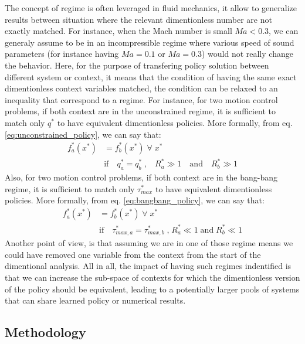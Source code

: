 The concept of regime is often leveraged in fluid mechanics, it allow to generalize results between situation where the relevant dimentionless number are not exactly matched. For instance, when the Mach number is small $Ma < 0.3$, we can generaly assume to be in an incompressible regime where various speed of sound parameters (for instance having $Ma=0.1$ or $Ma=0.3$) would not really change the behavior. Here, for the purpose of transfering policy solution between different system or context, it means that the condition of having the same exact dimentionless context variables matched, the condition can be relaxed to an inequality that correspond to a regime. For instance, for two motion control problems, if both context are in the unconstrained regime, it is sufficient to match only $q^*$ to have equivalent dimentionless policies. More formally, from eq. \eqref{eq:unconstrained_policy}, we can say that:
\begin{align}
f_a^*(x^*) &= f_b^*(x^*) \;\forall\;  x^* 
\\ &\text{if} \quad q^*_a=q^*_b \; \text{,} \quad R^*_a \gg 1 \quad \text{and} \quad R^*_b \gg 1
\end{align}
Also, for two motion control problems, if both context are in the bang-bang regime, it is sufficient to match only $\tau_{max}^*$ to have equivalent dimentionless policies. More formally, from eq. \eqref{eq:bangbang_policy}, we can say that:
\begin{align}
f_a^*(x^*) &= f_b^*(x^*) \;\forall\;  x^* 
\\ &\text{if} \quad \tau_{max,a}^*=\tau_{max,b}^* \; \text{,} \; R^*_a \ll 1 \; \text{and} \; R^*_b \ll 1
\end{align}
Another point of view, is that assuming we are in one of those regime means we could have removed one variable from the context from the start of the dimentional analysis. All in all, the impact of having such regimes indentified is that we can increase the sub-space of contexts for which the dimentionless version of the policy should be equivalent, leading to a potentially larger pools of systems that can share learned policy or numerical results. 








\subsection{Methodology}

